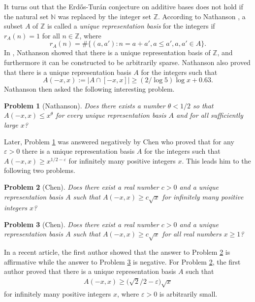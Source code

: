 \documentclass[12pt,a4paper,reqno]{amsart}
\numberwithin{equation}{section}
\theoremstyle{plain}
\newtheorem{problem}{Problem}
\theoremstyle{definition}
\begin{document}
It turns out that the Erd\H os-Tur\'an conjecture on additive bases does not hold if the natural set $\mathbb{N}$ was replaced by the integer set $\mathbb{Z}$. According to Nathanson \cite{Nathanson}, a subset $A$ of $\mathbb{Z}$ is called a {\it unique representation basis} for the integers if $r_A(n)=1$ for all $n\in \mathbb{Z}$, where
$$
r_A(n)=\#\big\{(a,a'):n=a+a',a\le a',a,a'\in A\big\}.
$$
In \cite{Nathanson}, Nathanson showed that there is a unique representation basis of $\mathbb{Z}$, and furthermore it can be constructed to be arbitrarily sparse. Nathanson also proved that there is a unique representation basis $A$ for the integers such that
$$
A(-x,x):=\big|A\cap [-x,x]\big|\ge (2/\log 5)\log x+0.63.
$$
Nathanson then asked the following interesting problem.

\begin{problem}[Nathanson]\label{problem1}
Does there exists a number $\theta<1/2$ so that $A(-x,x)\le x^\theta$ for every unique representation basis $A$ and for all sufficiently large $x$? 
\end{problem}

Later, Problem \ref{problem1} was answered negatively by Chen \cite{chen} who proved that for any $\varepsilon>0$ there is a unique representation basis $A$ for the integers such that $A(-x,x)\ge x^{1/2-\varepsilon}$ for infinitely many positive integers $x$.
This leads him to the following two problems. 

\begin{problem}[Chen]\label{problem2}
Does there exist a real number $c>0$ and a unique representation basis $A$ such that
$A(-x,x)\ge c\sqrt{x}$ for infinitely many positive integers $x$?
\end{problem}

\begin{problem}[Chen]\label{problem3}
Does there exist a real number $c>0$ and a unique representation basis $A$ such that
$A(-x,x)\ge c\sqrt{x}$ for all real numbers $x\ge 1$?
\end{problem}

In a recent article, the first author \cite{Ding} showed that the answer to Problem \ref{problem2} is affirmative while the answer to Problem \ref{problem3} is negative. For Problem \ref{problem2}, the first author proved that there is a unique representation basis $A$ such that 
\begin{align}\label{eq-0204-1}
A(-x,x)\ge \big(\sqrt{2}/2-\varepsilon\big)\sqrt{x}
\end{align}
for infinitely many positive integers $x$, where $\varepsilon>0$ is arbitrarily small. 
\end{document}
